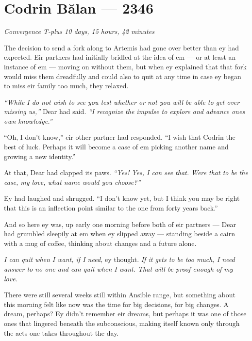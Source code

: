\hypertarget{codrin-bux103lan-2346}{%
\chapter{Codrin Bălan — 2346}\label{codrin-bux103lan-2346}}

\begin{center}
\emph{Convergence T-plus 10 days, 15 hours, 42 minutes}
\end{center}

\noindent The decision to send a fork along to Artemis had gone over better than ey had expected. Eir partners had initially bridled at the idea of em — or at least an instance of em — moving on without them, but when ey explained that that fork would miss them dreadfully and could also to quit at any time in case ey began to miss eir family too much, they relaxed.

\emph{``While I do not wish to see you test whether or not you will be able to get over missing us,''} Dear had said. \emph{``I recognize the impulse to explore and advance ones own knowledge.''}

``Oh, I don't know,'' eir other partner had responded. ``I wish that Codrin the best of luck. Perhaps it will become a case of em picking another name and growing a new identity.''

At that, Dear had clapped its paws. \emph{``Yes! Yes, I can see that. Were that to be the case, my love, what name would you choose?''}

Ey had laughed and shrugged. ``I don't know yet, but I think you may be right that this is an inflection point similar to the one from forty years back.''

And so here ey was, up early one morning before both of eir partners — Dear had grumbled sleepily at em when ey slipped away — standing beside a cairn with a mug of coffee, thinking about changes and a future alone.

\emph{I can quit when I want, if I need,} ey thought. \emph{If it gets to be too much, I need answer to no one and can quit when I want. That will be proof enough of my love.}

There were still several weeks still within Ansible range, but something about this morning felt like now was the time for big decisions, for big changes. A dream, perhaps? Ey didn't remember eir dreams, but perhaps it was one of those ones that lingered beneath the subconscious, making itself known only through the acts one takes throughout the day.


